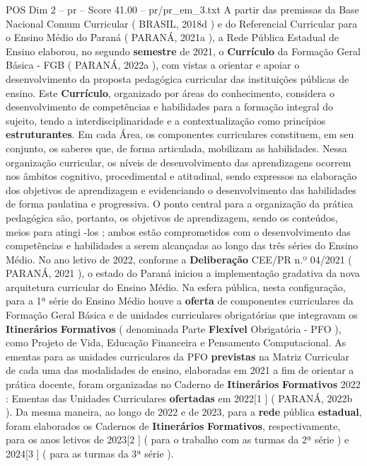 \begin{textsample}{POS Dim 2 – pr – Score 41.00 – pr/pr\_em\_3.txt}  \label{ex:f2_pos_111}
A partir das premissas da Base Nacional Comum Curricular ( BRASIL, 2018d ) e do Referencial Curricular para o Ensino Médio do Paraná ( PARANÁ, 2021a ), a Rede Pública Estadual de Ensino elaborou, no segundo \textbf{semestre} de 2021, o \textbf{Currículo} da Formação Geral Básica - FGB ( PARANÁ, 2022a ), com vistas a orientar e apoiar o desenvolvimento da proposta pedagógica curricular das instituições públicas de ensino.
Este \textbf{Currículo}, organizado por áreas do conhecimento, considera o desenvolvimento de competências e habilidades para a formação integral do sujeito, tendo a interdisciplinaridade e a contextualização como princípios \textbf{estruturantes}.
Em cada Área, os componentes curriculares constituem, em seu conjunto, os saberes que, de forma articulada, mobilizam as habilidades.
Nessa organização curricular, os níveis de desenvolvimento das aprendizagens ocorrem nos âmbitos cognitivo, procedimental e atitudinal, sendo expressos na elaboração dos objetivos de aprendizagem e evidenciando o desenvolvimento das habilidades de forma paulatina e progressiva.
O ponto central para a organização da prática pedagógica são, portanto, os objetivos de aprendizagem, sendo os conteúdos, meios para atingi -los ; ambos estão comprometidos com o desenvolvimento das competências e habilidades a serem alcançadas ao longo das três séries do Ensino Médio.
No ano letivo de 2022, conforme a \textbf{Deliberação} CEE/PR n.º 04/2021 ( PARANÁ, 2021 ), o estado do Paraná iniciou a implementação gradativa da nova arquitetura curricular do Ensino Médio.
Na esfera pública, nesta configuração, para a 1ª série do Ensino Médio houve a \textbf{oferta} de componentes curriculares da Formação Geral Básica e de unidades curriculares obrigatórias que integravam os \textbf{Itinerários} \textbf{Formativos} ( denominada Parte \textbf{Flexível} Obrigatória - PFO ), como Projeto de Vida, Educação Financeira e Pensamento Computacional.
As ementas para as unidades curriculares da PFO \textbf{previstas} na Matriz Curricular de cada uma das modalidades de ensino, elaboradas em 2021 a fim de orientar a prática docente, foram organizadas no Caderno de \textbf{Itinerários} \textbf{Formativos} 2022 : Ementas das Unidades Curriculares \textbf{ofertadas} em 2022[1 ] ( PARANÁ, 2022b ).
Da mesma maneira, ao longo de 2022 e de 2023, para a \textbf{rede} pública \textbf{estadual}, foram elaborados os Cadernos de \textbf{Itinerários} \textbf{Formativos}, respectivamente, para os anos letivos de 2023[2 ] ( para o trabalho com as turmas da 2ª série ) e 2024[3 ] ( para as turmas da 3ª série ).

\end{textsample}
